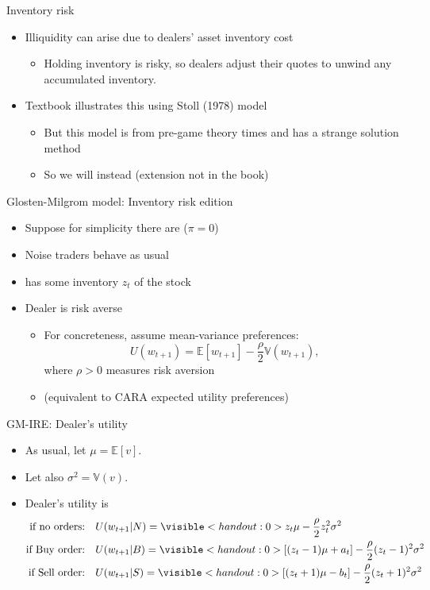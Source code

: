 \documentclass[english,10pt
,aspectratio=169
]{beamer}
\begin{document}
\begin{frame}{Inventory risk}
	\begin{itemize}
		\item Illiquidity can arise due to dealers' asset \alert{inventory cost}
		\begin{itemize}
			\item Holding inventory is \alert{risky}, so dealers adjust their quotes to unwind any accumulated inventory.
		\end{itemize}
		\pause
		\item Textbook illustrates this using Stoll (1978) model
		\begin{itemize}
			\item But this model is from pre-game theory times and has a strange solution method
			\item So we will instead  (extension not in the book)
		\end{itemize}
	\end{itemize}
\end{frame}


\begin{frame}{Glosten-Milgrom model: Inventory risk edition}
	\begin{itemize}
		\item Suppose for simplicity there are  ($\pi=0$)
		\item Noise traders behave as usual
		\item {} has some \alert{inventory} $z_t$ of the stock
		\item Dealer is \alert{risk averse}
		\begin{itemize}
			\item For concreteness, assume mean-variance preferences:
			\[
			U(w_{t+1})=\mathbb{E}[w_{t+1}] - \frac{\rho}{2} \mathbb{V}(w_{t+1}),
			\]
			where $\rho>0$ measures risk aversion
			\item (equivalent to CARA expected utility preferences)
		\end{itemize}
	\end{itemize}
\end{frame}


\begin{frame}{GM-IRE: Dealer's utility}
	\begin{itemize}
		\item As usual, let $\mu = \mathbb{E}[v]$.
		\item Let also $\sigma^2 = \mathbb{V}(v)$.
		\item Dealer's utility is
		\begin{align*}
			\text{if no orders:}\quad & U(w_{t+1}|N) = \visible<handout:0>{ z_t \mu - \frac{\rho}{2}z_t^2 \sigma^2 }
			\\
			\text{if Buy order:}\quad & U(w_{t+1}|B) = \visible<handout:0>{ \left[(z_t-1)\mu + a_t\right] - \frac{\rho}{2}(z_t-1)^2 \sigma^2 }
			\\
			\text{if Sell order:}\quad & U(w_{t+1}|S) = \visible<handout:0>{ \left[(z_t+1)\mu - b_t\right] - \frac{\rho}{2}(z_t+1)^2 \sigma^2 }
		\end{align*}
	\end{itemize}
\end{frame}
\end{document}
